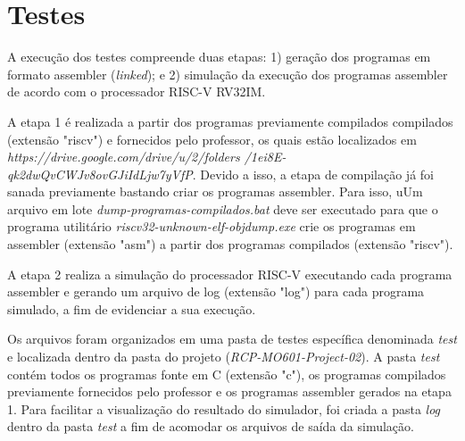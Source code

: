 
\section{Testes}

A execução dos testes compreende duas etapas: 1) geração dos programas em formato assembler (\textit{linked}); e 2) simulação da execução dos programas assembler de acordo com o processador RISC-V RV32IM.

A etapa 1 é realizada a partir dos programas previamente compilados compilados (extensão "riscv") e fornecidos pelo professor, os quais estão localizados em \textit{https://drive.google.com/drive/u/2/folders /1ei8E-qk2dwQvCWJv8ovGJiIdLjw7yVfP}. Devido a isso, a etapa de compilação já foi sanada previamente bastando criar os programas assembler. Para isso, uUm arquivo em lote \textit{dump-programas-compilados.bat} deve ser executado para que o programa utilitário \textit{riscv32-unknown-elf-objdump.exe} crie os programas em assembler (extensão "asm") a partir dos programas compilados (extensão "riscv"). 

A etapa 2 realiza a simulação do processador RISC-V executando cada programa assembler e gerando um arquivo de log (extensão "log") para cada programa simulado, a fim de evidenciar a sua execução.

Os arquivos foram organizados em uma pasta de testes específica denominada \textit{test} e localizada dentro da pasta do projeto (\textit{RCP-MO601-Project-02}). A pasta \textit{test} contém todos os programas fonte em C (extensão "c"), os programas compilados previamente fornecidos pelo professor e os programas assembler gerados na etapa 1. Para facilitar a visualização do resultado do simulador, foi criada a pasta \textit{log} dentro da pasta \textit{test} a fim de acomodar os arquivos de saída da simulação.
